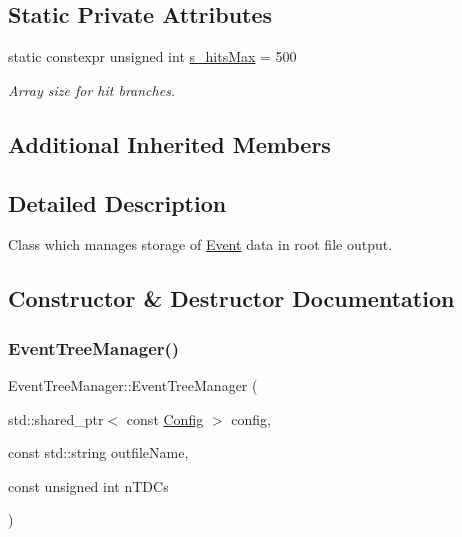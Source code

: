 \subsection*{Static Private Attributes}
\begin{DoxyCompactItemize}
\item 
static constexpr unsigned int \hyperlink{class_event_tree_manager_aab35ad52374d52149bde894c8af7a8c5}{s\+\_\+hits\+Max} = 500
\begin{DoxyCompactList}\small\item\em Array size for hit branches. \end{DoxyCompactList}\end{DoxyCompactItemize}
\subsection*{Additional Inherited Members}


\subsection{Detailed Description}
Class which manages storage of \hyperlink{class_event}{Event} data in root file output. 

\subsection{Constructor \& Destructor Documentation}
\mbox{\label{class_event_tree_manager_ac56641a71c28863d76fcc598ac8e32df}} 
\subsubsection{\texorpdfstring{Event\+Tree\+Manager()}{EventTreeManager()}}
{\footnotesize\ttfamily Event\+Tree\+Manager\+::\+Event\+Tree\+Manager (\begin{DoxyParamCaption}\item[{std\+::shared\+\_\+ptr$<$ const \hyperlink{class_config}{Config} $>$}]{config,  }\item[{const std\+::string}]{outfile\+Name,  }\item[{const unsigned int}]{n\+T\+D\+Cs }\end{DoxyParamCaption})}



